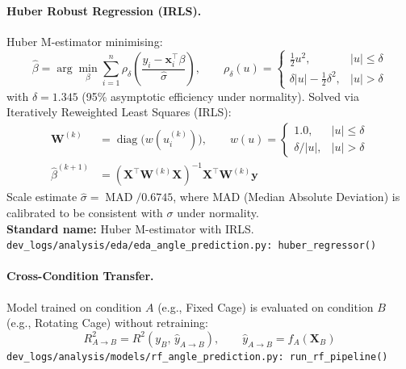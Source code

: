 \paragraph{Huber Robust Regression (IRLS).}
Huber M-estimator minimising:
\begin{equation}
    \hat{\beta} = \arg\min_{\beta} \sum_{i=1}^{n} \rho_{\delta}\!\left(\frac{y_i - \mathbf{x}_i^\top\beta}{\hat{\sigma}}\right),\qquad
    \rho_{\delta}(u) = \begin{cases}
        \frac{1}{2}u^2, & |u| \le \delta \\[4pt]
        \delta|u| - \frac{1}{2}\delta^2, & |u| > \delta
    \end{cases}
\end{equation}
with $\delta = 1.345$ (95\% asymptotic efficiency under normality). Solved via Iteratively Reweighted Least Squares (IRLS):
\begin{align}
    \mathbf{W}^{(k)} &= \operatorname{diag}\bigl(w(u_i^{(k)})\bigr),\qquad
    w(u) = \begin{cases} 1.0, & |u| \le \delta \\ \delta/|u|, & |u| > \delta \end{cases} \\
    \hat{\beta}^{(k+1)} &= (\mathbf{X}^\top \mathbf{W}^{(k)} \mathbf{X})^{-1} \mathbf{X}^\top \mathbf{W}^{(k)} \mathbf{y}
\end{align}
Scale estimate $\hat{\sigma} = \operatorname{MAD} / 0.6745$, where MAD (Median Absolute Deviation) is calibrated to be consistent with $\sigma$ under normality.\\
\textbf{Standard name:} Huber M-estimator with IRLS.\\
\texttt{\small dev\_logs/analysis/eda/eda\_angle\_prediction.py:\ huber\_regressor()}

\medskip
\paragraph{Cross-Condition Transfer.}
Model trained on condition $A$ (e.g., Fixed Cage) is evaluated on condition $B$ (e.g., Rotating Cage) without retraining:
\begin{equation}
    R^2_{A \to B} = R^2(y_B,\, \hat{y}_{A \to B}),\qquad \hat{y}_{A \to B} = f_A(\mathbf{X}_B)
\end{equation}
\texttt{\small dev\_logs/analysis/models/rf\_angle\_prediction.py:\ run\_rf\_pipeline()}

\endinput
